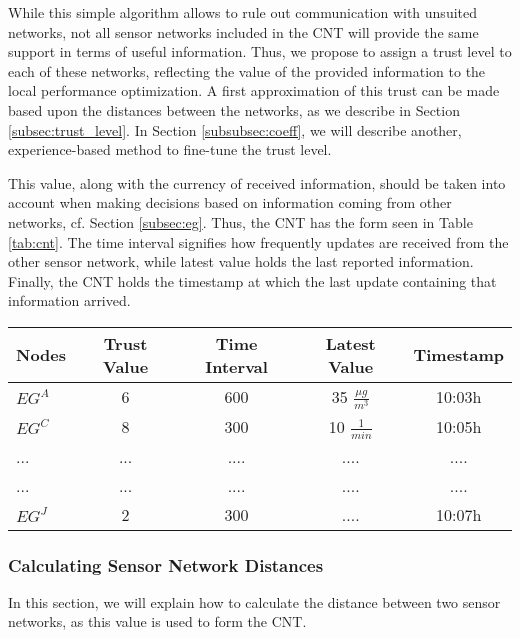 \documentclass[onecolumn]{jaise2e}
\begin{document}
While this simple algorithm allows to rule out communication with unsuited networks, not all sensor networks included in the CNT will provide the same support in terms of useful information. Thus, we propose to assign a trust level to each of these networks, reflecting the value of the provided information to the local performance optimization. A first approximation of this trust can be made based upon the distances between the networks, as we describe in Section \ref{subsec:trust_level}. In Section \ref{subsubsec:coeff}, we will describe another, experience-based method to fine-tune the trust level. 

This value, along with the currency of received information, should be taken into account when making decisions based on information coming from other networks, cf. Section \ref{subsec:eg}. Thus, the CNT has the form seen in Table \ref{tab:cnt}. The time interval signifies how frequently updates are received from the other sensor network, while latest value holds the last reported information. Finally, the CNT holds the timestamp at which the last update containing that information arrived. 

\begin{table*}[!t]
\centering 
\caption{Cooperating Networks Table}
\begin{tabular}{lcccc}
\hline
Nodes & Trust Value & Time Interval  & Latest Value & Timestamp \\
\hline
$EG^A$	& 6      & 600            & 35 $\frac{\mu g}{m^3}$                & 10:03h \\
$EG^C$	& 8      & 300            & 10 $\frac{1}{min}$                 & 10:05h \\
...		& ...      & ....            & ....                 & .... \\ 
...		& ...      & ....            & ....                 & .... \\ 
$EG^J$  & 2      & 300            & ....                 & 10:07h \\
\hline
\end{tabular}
\label{tab:cnt}
\end{table*}
 

\subsubsection{Calculating Sensor Network Distances}\label{subsubsec:network_distance}

In this section, we will explain how to calculate the distance between two sensor networks, as this value is used to form the CNT.
\end{document}
